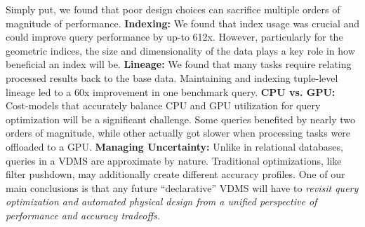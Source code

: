 Simply put, we found that poor design choices can sacrifice multiple orders of magnitude of performance.
\textbf{Indexing: } We found that index usage was crucial and could improve query performance by up-to 612x. However, particularly for the geometric indices, the size and dimensionality of the data plays a key role in how beneficial an index will be.
\textbf{Lineage: }We found that many tasks require relating processed results back to the base data.
Maintaining and indexing tuple-level lineage led to a 60x improvement in one benchmark query.
\textbf{CPU vs. GPU: } Cost-models that accurately balance CPU and GPU utilization for query optimization will be a significant challenge. Some queries benefited by nearly two orders of magnitude, while other actually got slower when processing tasks were offloaded to a GPU.
\textbf{Managing Uncertainty: } Unlike in relational databases, queries in a VDMS are approximate by nature. Traditional optimizations, like filter pushdown, may additionally create different accuracy profiles.  One of our main conclusions is that any future ``declarative'' VDMS will have to \emph{revisit query optimization and automated physical design from a unified perspective of performance and accuracy tradeoffs.}  







